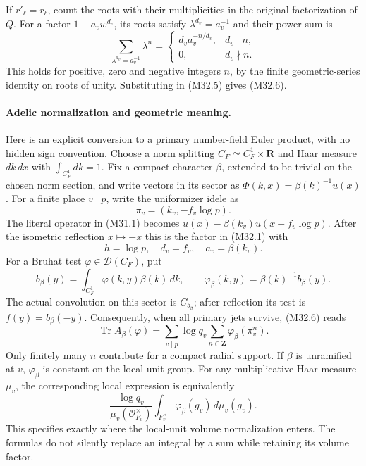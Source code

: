 If $r'_\ell=r_\ell$, count the roots with their
multiplicities in the original factorization of $Q$.
For a factor $1-a_vw^{d_v}$, its roots satisfy
$\lambda^{d_v}=a_v^{-1}$ and their power sum is
\[
 \sum_{\lambda^{d_v}=a_v^{-1}}\lambda^n
   =\begin{cases}
       d_va_v^{-n/d_v},&d_v\mid n,\\
       0,&d_v\nmid n.
     \end{cases}
 \tag{M32.18}
\]
This holds for positive, zero and negative integers $n$,
by the finite geometric-series identity on roots of unity.
Substituting in (M32.5) gives (M32.6).

\paragraph{Adelic normalization and geometric meaning.}
Here is an explicit conversion to a primary number-field
Euler product, with no hidden sign convention.
Choose a norm splitting
$C_F\simeq C_F^1\times\mathbf R$ and Haar measure
$dk\,dx$ with $\int_{C_F^1}dk=1$.
Fix a compact character $\beta$, extended to be trivial
on the chosen norm section, and write vectors in its
sector as $\Phi(k,x)=\beta(k)^{-1}u(x)$.
For a finite place $v\mid p$, write the uniformizer idele
as
\[
             \pi_v=(k_v,-f_v\log p).
\]
The literal operator in (M31.1) becomes
$u(x)-\beta(k_v)u(x+f_v\log p)$.
After the isometric reflection $x\mapsto-x$ this is
the factor in (M32.1) with
\[
              h=\log p,\quad d_v=f_v,
                         \quad a_v=\beta(k_v).
 \tag{M32.19}
\]
For a Bruhat test $\varphi\in\mathcal D(C_F)$, put
\[
 b_\beta(y)=\int_{C_F^1}\varphi(k,y)\beta(k)\,dk,
 \qquad
 \varphi_\beta(k,y)=\beta(k)^{-1}b_\beta(y).
 \tag{M32.20}
\]
The actual convolution on this sector is $C_{b_\beta}$;
after reflection its test is $f(y)=b_\beta(-y)$.
Consequently, when all primary jets survive, (M32.6) reads
\[
     \operatorname{Tr} A_\beta(\varphi)
       =\sum_{v\mid p}\log q_v
                          \sum_{n\in\mathbf Z}\varphi_\beta(\pi_v^n).
 \tag{M32.21}
\]
Only finitely many $n$ contribute for a compact radial
support.  If $\beta$ is unramified at $v$,
$\varphi_\beta$ is constant on the local unit group.
For any multiplicative Haar measure $\mu_v$, the
corresponding local expression is equivalently
\[
 \frac{\log q_v}{\mu_v(\mathcal O_{F_v}^{\times})}
          \int_{F_v^{\times}}\varphi_\beta(g_v)\,d\mu_v(g_v).
 \tag{M32.22}
\]
This specifies exactly where the local-unit volume
normalization enters.  The formulas do not silently
replace an integral by a sum while retaining its volume factor.

